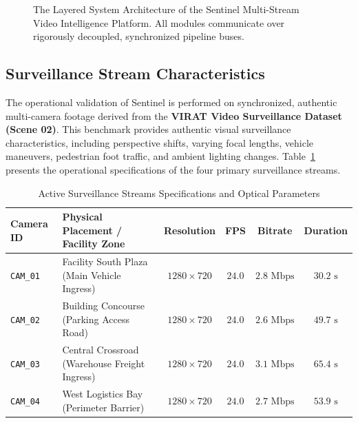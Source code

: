 \documentclass[12pt,a4paper]{article}
\begin{document}
\begin{figure}[htbp]
\caption{The Layered System Architecture of the Sentinel Multi-Stream Video Intelligence Platform. All modules communicate over rigorously decoupled, synchronized pipeline buses.}
\label{fig:architecture}
\end{figure}

\subsection{Surveillance Stream Characteristics}
The operational validation of Sentinel is performed on synchronized, authentic multi-camera footage derived from the \textbf{VIRAT Video Surveillance Dataset (Scene 02)}. This benchmark provides authentic visual surveillance characteristics, including perspective shifts, varying focal lengths, vehicle maneuvers, pedestrian foot traffic, and ambient lighting changes. Table~\ref{tab:cameras} presents the operational specifications of the four primary surveillance streams.

\begin{table}[htbp]
\centering
\caption{Active Surveillance Streams Specifications and Optical Parameters}
\label{tab:cameras}
\fontsize{10pt}{12pt}\selectfont
\begin{tabularx}{\textwidth}{lXcccc}
\toprule
\textbf{Camera ID} & \textbf{Physical Placement / Facility Zone} & \textbf{Resolution} & \textbf{FPS} & \textbf{Bitrate} & \textbf{Duration} \\
\midrule
\texttt{CAM\_01} & Facility South Plaza (Main Vehicle Ingress) & $1280 \times 720$ & $24.0$ & $2.8\text{ Mbps}$ & $30.2\text{ s}$ \\
\texttt{CAM\_02} & Building Concourse (Parking Access Road) & $1280 \times 720$ & $24.0$ & $2.6\text{ Mbps}$ & $49.7\text{ s}$ \\
\texttt{CAM\_03} & Central Crossroad (Warehouse Freight Ingress) & $1280 \times 720$ & $24.0$ & $3.1\text{ Mbps}$ & $65.4\text{ s}$ \\
\texttt{CAM\_04} & West Logistics Bay (Perimeter Barrier) & $1280 \times 720$ & $24.0$ & $2.7\text{ Mbps}$ & $53.9\text{ s}$ \\
\bottomrule
\end{tabularx}
\end{table}
\end{document}
